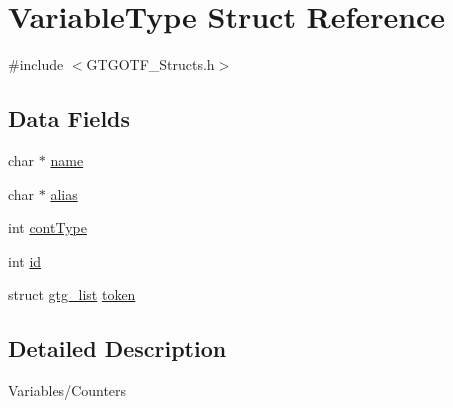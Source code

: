 \hypertarget{structVariableType}{\section{Variable\-Type Struct Reference}
\label{structVariableType}
}


{\ttfamily \#include $<$G\-T\-G\-O\-T\-F\-\_\-\-Structs.\-h$>$}

\subsection*{Data Fields}
\begin{DoxyCompactItemize}
\item 
char $\ast$ \hyperlink{structVariableType_a2e98ef3f43fc7bb3b5f35c608e465626}{name}
\item 
char $\ast$ \hyperlink{structVariableType_a1f40c8f260ce4672bdcbaadc59282c42}{alias}
\item 
int \hyperlink{structVariableType_a5183bdba4b0391794706ba8a81f96be7}{cont\-Type}
\item 
int \hyperlink{structVariableType_ad770137e0e1b6071aebe2df4fd23a975}{id}
\item 
struct \hyperlink{structgtg__list}{gtg\-\_\-list} \hyperlink{structVariableType_a2dc230e2da906c4f1d4fc4fcab2f365a}{token}
\end{DoxyCompactItemize}


\subsection{Detailed Description}
Variables/\-Counters 

